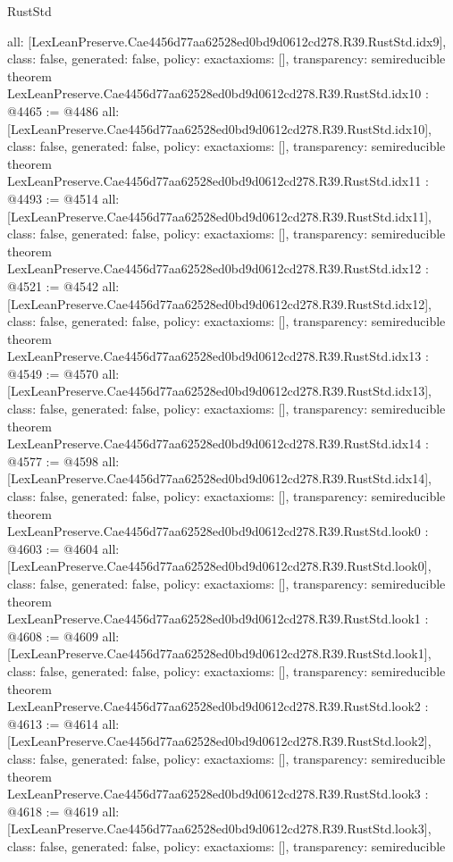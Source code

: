 \begin{lexlean}{RustStd}
\begin{coremodule}
{  all: [LexLeanPreserve.Cae4456d77aa62528ed0bd9d0612cd278.R39.RustStd.idx9],
  class: false,
  generated: false,
  policy: exact{axioms: []},
  transparency: semireducible
}
theorem LexLeanPreserve.Cae4456d77aa62528ed0bd9d0612cd278.R39.RustStd.idx10 : @4465 := @4486 {
  all: [LexLeanPreserve.Cae4456d77aa62528ed0bd9d0612cd278.R39.RustStd.idx10],
  class: false,
  generated: false,
  policy: exact{axioms: []},
  transparency: semireducible
}
theorem LexLeanPreserve.Cae4456d77aa62528ed0bd9d0612cd278.R39.RustStd.idx11 : @4493 := @4514 {
  all: [LexLeanPreserve.Cae4456d77aa62528ed0bd9d0612cd278.R39.RustStd.idx11],
  class: false,
  generated: false,
  policy: exact{axioms: []},
  transparency: semireducible
}
theorem LexLeanPreserve.Cae4456d77aa62528ed0bd9d0612cd278.R39.RustStd.idx12 : @4521 := @4542 {
  all: [LexLeanPreserve.Cae4456d77aa62528ed0bd9d0612cd278.R39.RustStd.idx12],
  class: false,
  generated: false,
  policy: exact{axioms: []},
  transparency: semireducible
}
theorem LexLeanPreserve.Cae4456d77aa62528ed0bd9d0612cd278.R39.RustStd.idx13 : @4549 := @4570 {
  all: [LexLeanPreserve.Cae4456d77aa62528ed0bd9d0612cd278.R39.RustStd.idx13],
  class: false,
  generated: false,
  policy: exact{axioms: []},
  transparency: semireducible
}
theorem LexLeanPreserve.Cae4456d77aa62528ed0bd9d0612cd278.R39.RustStd.idx14 : @4577 := @4598 {
  all: [LexLeanPreserve.Cae4456d77aa62528ed0bd9d0612cd278.R39.RustStd.idx14],
  class: false,
  generated: false,
  policy: exact{axioms: []},
  transparency: semireducible
}
theorem LexLeanPreserve.Cae4456d77aa62528ed0bd9d0612cd278.R39.RustStd.look0 : @4603 := @4604 {
  all: [LexLeanPreserve.Cae4456d77aa62528ed0bd9d0612cd278.R39.RustStd.look0],
  class: false,
  generated: false,
  policy: exact{axioms: []},
  transparency: semireducible
}
theorem LexLeanPreserve.Cae4456d77aa62528ed0bd9d0612cd278.R39.RustStd.look1 : @4608 := @4609 {
  all: [LexLeanPreserve.Cae4456d77aa62528ed0bd9d0612cd278.R39.RustStd.look1],
  class: false,
  generated: false,
  policy: exact{axioms: []},
  transparency: semireducible
}
theorem LexLeanPreserve.Cae4456d77aa62528ed0bd9d0612cd278.R39.RustStd.look2 : @4613 := @4614 {
  all: [LexLeanPreserve.Cae4456d77aa62528ed0bd9d0612cd278.R39.RustStd.look2],
  class: false,
  generated: false,
  policy: exact{axioms: []},
  transparency: semireducible
}
theorem LexLeanPreserve.Cae4456d77aa62528ed0bd9d0612cd278.R39.RustStd.look3 : @4618 := @4619 {
  all: [LexLeanPreserve.Cae4456d77aa62528ed0bd9d0612cd278.R39.RustStd.look3],
  class: false,
  generated: false,
  policy: exact{axioms: []},
  transparency: semireducible
}
\end{coremodule}
\end{lexlean}
